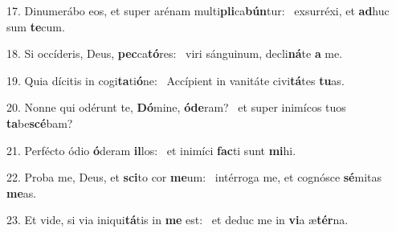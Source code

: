 17. Dinumerábo eos, et super arénam multi\textbf{pli}ca\textbf{bún}tur: \ast\  exsurréxi, et \textbf{ad}huc sum \textbf{te}cum.\

18. Si occíderis, Deus, \textbf{pec}ca\textbf{tó}res: \ast\  viri sánguinum, decli\textbf{ná}te \textbf{a} me.\

19. Quia dícitis in cogi\textbf{ta}ti\textbf{ó}ne: \ast\  Accípient in vanitáte civi\textbf{tá}tes \textbf{tu}as.\

20. Nonne qui odérunt te, \textbf{Dó}mine, \textbf{ó}\textbf{de}ram? \ast\  et super inimícos tuos \textbf{ta}be\textbf{scé}bam?\

21. Perfécto ódio \textbf{ó}deram \textbf{il}los: \ast\  et inimíci \textbf{fac}ti sunt \textbf{mi}hi.\

22. Proba me, Deus, et \textbf{sci}to cor \textbf{me}um: \ast\  intérroga me, et cognósce \textbf{sé}mitas \textbf{me}as.\

23. Et vide, si via iniqui\textbf{tá}tis in \textbf{me} est: \ast\  et deduc me in \textbf{vi}a æ\textbf{tér}na.\

